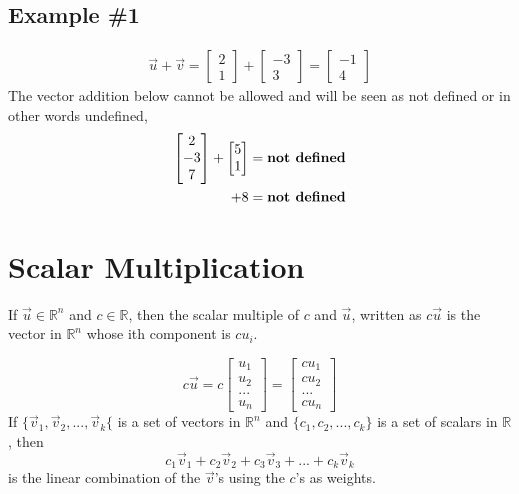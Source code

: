 \documentclass[11pt]{article} %
\begin{document}
\subsection*{Example \#1}
\begin{gather*}
\vec{u} + \vec{v} =
\begin{bmatrix}
2\\
1
\end{bmatrix} +
\begin{bmatrix}
-3\\
3
\end{bmatrix} =
\begin{bmatrix}
-1\\
4
\end{bmatrix}
\end{gather*}
The vector addition below cannot be allowed and will be seen as not defined or in other words undefined,
\begin{align*}
\begin{bmatrix}
2\\
-3\\
7
\end{bmatrix} +
\begin{bmatrix}
5\\
1
\end{bmatrix} &= \text{\textbf{not defined}}\\
+ 8 &= \text{\textbf{not defined}}\\
\end{align*}

\section*{Scalar Multiplication}
If $\vec{u} \in \mathbb{R}^n$ and $c \in \mathbb{R}$, then the scalar multiple of $c$ and $\vec{u}$, written as $c\vec{u}$ is the vector in $\mathbb{R}^n$ whose ith component is $cu_i$.

\begin{equation}
c\vec{u} = c
\begin{bmatrix}
u_1\\
u_2\\
...\\
u_n
\end{bmatrix} =
\begin{bmatrix}
cu_1\\
cu_2\\
...\\
cu_n
\end{bmatrix}
\end{equation}
If $\{ \vec{v}_1, \vec{v}_2, ..., \vec{v}_k \{ $ is a set of vectors in $\mathbb{R}^n$ and $\{ c_1, c_2, ..., c_k \}$ is a set of scalars in $\mathbb{R}$, then
\begin{equation}
c_1\vec{v}_1 + c_2\vec{v}_2 + c_3\vec{v}_3 + ... + c_k\vec{v}_k
\end{equation}
is the linear combination of the $\vec{v}$'s using the $c$'s as weights.\\
\end{document}

